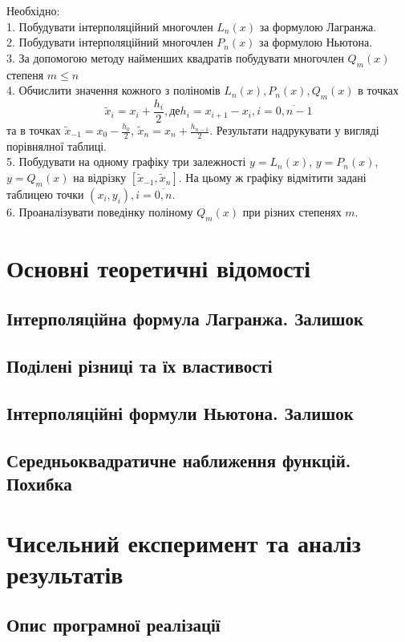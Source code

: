 \documentclass[14pt,a4paper,titlepage]{extarticle}
\begin{document}
Необхідно:\\
1. Побудувати інтерполяційний многочлен $L_n(x)$ за формулою Лагранжа.\\
2. Побудувати інтерполяційний многочлен $P_n(x)$ за формулою Ньютона.\\
3. За допомогою методу найменших квадратів побудувати многочлен $Q_m(x)$ степеня $m \leqslant n$\\
4. Обчислити значення кожного з поліномів $L_n(x), P_n(x), Q_m(x)$ в точках
$$
\widetilde{x}_i = x_i + \frac{h_i}{2}, де h_i = x_{i+1} - x_i, i = \overline{0, n-1}
$$
та в точках $\widetilde{x}_{-1} = x_0 - \frac{h_0}{2}$, $\widetilde{x}_n = x_n + \frac{h_{n-1}}{2}$.
Результати надрукувати у вигляді порівнялної таблиці.\\
5. Побудувати на одному графіку три залежності $y = L_n(x)$, $y = P_n(x)$, $y = Q_m(x)$ на відрізку $\left[\widetilde{x}_{-1}, \widetilde{x}_{n}\right]$. На цьому ж графіку відмітити задані таблицею точки $\left(x_i, y_i\right), i = \overline{0, n}$.\\
6. Проаналізувати поведінку поліному $Q_m(x)$ при різних степенях $m$.\\
\newpage
{\centering \section{Основні теоретичні відомості}}
{\centering \subsection{Інтерполяційна формула Лагранжа. Залишок}}
{\centering \subsection{Поділені різниці та їх властивості}}
{\centering \subsection{Інтерполяційні формули Ньютона. Залишок}}
{\centering \subsection{Середньоквадратичне наближення функцій. Похибка}}
{\centering \section{Чисельний експеримент та аналіз результатів}}
{\centering \subsection{Опис програмної реалізації}}
\end{document}
